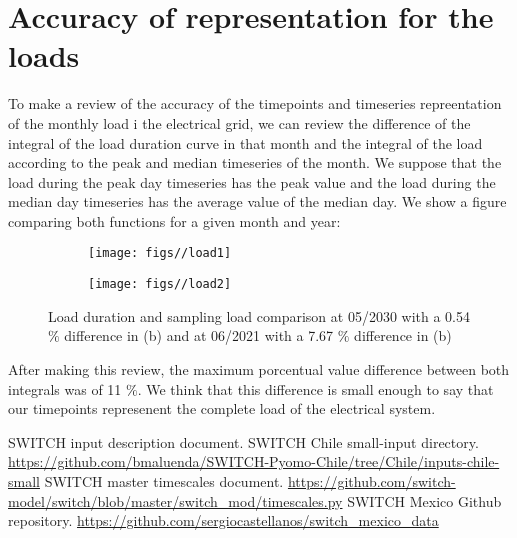 \documentclass{article}
\begin{document}
\section{Accuracy of representation for the loads}
To make a review of the accuracy of the timepoints and timeseries repreentation of the monthly load i the electrical grid, we can review the difference of the integral of the load duration curve in that month and the integral of the load according to the peak and median timeseries of the month. We suppose that the load during the peak day timeseries has the peak value and the load during the median day timeseries has the average value of the median day. We show a figure comparing both functions for a given month and year:
\begin{figure}[H]
\centering
\begin{subfigure}[h]{.45\textwidth}
\texttt{[image: figs//load1]}
\caption{}
\end{subfigure}
\begin{subfigure}[h]{.45\textwidth}
\texttt{[image: figs//load2]}
\caption{}
\end{subfigure}
\caption{Load duration and sampling load comparison at 05/2030 with a 0.54 $\%$ difference in (b) and at 06/2021 with a 7.67 $\%$ difference in (b)}
\end{figure}  
After making this review, the maximum porcentual value difference  between both integrals was of 11 $\%$. We think that this difference is small enough to say that our timepoints represenent the complete load of the electrical system.
\begin{thebibliography}{9}
 SWITCH input description document.
 SWITCH Chile small-input directory. \url{https://github.com/bmaluenda/SWITCH-Pyomo-Chile/tree/Chile/inputs-chile-small}
 SWITCH master timescales document. \url{https://github.com/switch-model/switch/blob/master/switch_mod/timescales.py}
 SWITCH Mexico Github repository. \url{https://github.com/sergiocastellanos/switch_mexico_data}
\end{thebibliography}
\end{document}
